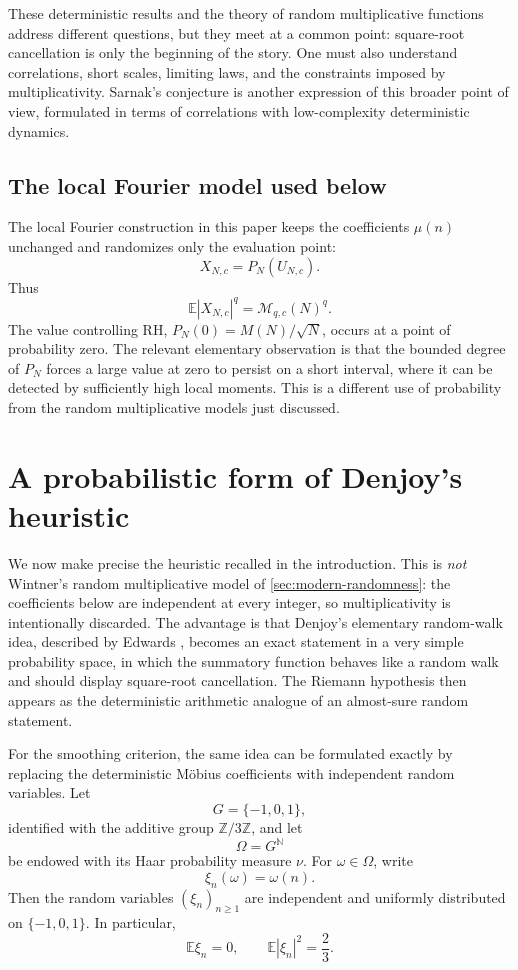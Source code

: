 \documentclass[11pt]{article}
\theoremstyle{remark}
\newcommand{\E}{\mathbb E}
\newcommand{\Mcal}{\mathcal M}
\begin{document}
These deterministic results and the theory of random multiplicative
functions address different questions, but they meet at a common
point: square-root cancellation is only the beginning of the story.
One must also understand correlations, short scales, limiting laws, and
the constraints imposed by multiplicativity.  Sarnak's conjecture is
another expression of this broader point of view, formulated in terms
of correlations with low-complexity deterministic dynamics.

\subsection{The local Fourier model used below}

The local Fourier construction in this paper keeps the coefficients
\(\mu(n)\) unchanged and randomizes only the evaluation point:
\[
 X_{N,c}=P_N(U_{N,c}).
\]
Thus
\[
 \E|X_{N,c}|^q=\Mcal_{q,c}(N)^q.
\]
The value controlling RH, \(P_N(0)=M(N)/\sqrt N\), occurs at a point
of probability zero.  The relevant elementary observation is that the
bounded degree of \(P_N\) forces a large value at zero to persist on a
short interval, where it can be detected by sufficiently high local
moments.  This is a different use of probability from the random
multiplicative models just discussed.

\section{A probabilistic form of Denjoy's heuristic}
\label{sec:probabilistic-form}

We now make precise the heuristic recalled in the introduction.  This
is \emph{not} Wintner's random multiplicative model of
\cref{sec:modern-randomness}: the coefficients below are independent
at every integer, so multiplicativity is intentionally discarded.  The
advantage is that Denjoy's elementary random-walk idea, described by
Edwards \cite[pp.~263--266]{Edwards}, becomes an exact statement in a
very simple probability space, in which the summatory function behaves
like a random walk and should display square-root cancellation.  The
Riemann hypothesis then appears as the deterministic arithmetic
analogue of an almost-sure random statement.

For the smoothing criterion, the same idea can be formulated exactly
by replacing the deterministic M\"obius coefficients with independent
random variables.
Let
\[
G=\{-1,0,1\},
\]
identified with the additive group \(\mathbb Z/3\mathbb Z\), and let
\[
\Omega=G^{\mathbb N}
\]
be endowed with its Haar probability measure \(\nu\).  For
\(\omega\in\Omega\), write
\[
\xi_n(\omega)=\omega(n).
\]
Then the random variables \((\xi_n)_{n\geq1}\) are independent and
uniformly distributed on \(\{-1,0,1\}\).  In particular,
\[
\mathbb E\xi_n=0,
\qquad
\mathbb E|\xi_n|^2=\frac23.
\]
\end{document}
